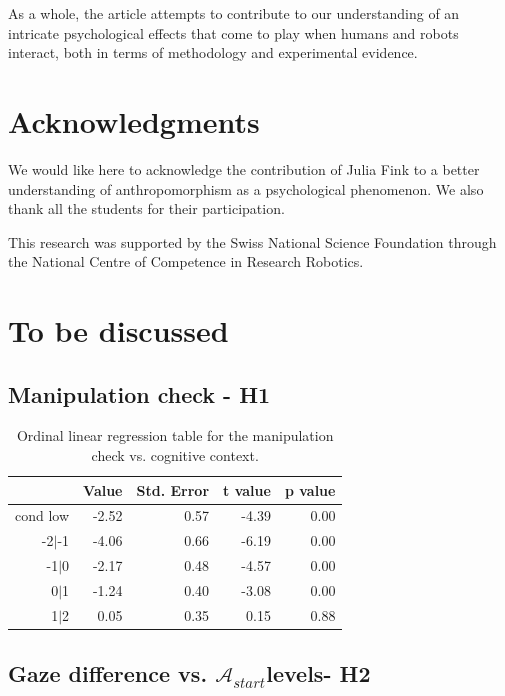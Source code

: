 \documentclass[lettersize, noapacite, twoside, HRI]{apa_HRI}
\newcommand{\anti}{{$\mathcal{A}_{start}$\xspace}}
\begin{document}
As a whole, the article attempts to contribute to our understanding of an
intricate psychological effects that come to play when humans and robots
interact, both in terms of methodology and experimental evidence.


\section*{Acknowledgments}

We would like here to acknowledge the contribution of Julia Fink to a better
understanding of anthropomorphism as a psychological phenomenon. We also thank
all the students for their participation.

This research was supported by the Swiss National Science Foundation through the
National Centre of Competence in Research Robotics.

\newpage


\section {To be discussed}


\subsection{Manipulation check - H1}


\begin{table}[ht]
\caption{Ordinal linear regression table for the manipulation check vs. cognitive context.}
\centering
\begin{tabular}{rrrrr}
  \hline
 & Value & Std. Error & t value & p value \\ 
  \hline
cond low & -2.52 & 0.57 & -4.39 & 0.00 \\ 
  -2$|$-1 & -4.06 & 0.66 & -6.19 & 0.00 \\ 
  -1$|$0 & -2.17 & 0.48 & -4.57 & 0.00 \\ 
  0$|$1 & -1.24 & 0.40 & -3.08 & 0.00 \\ 
  1$|$2 & 0.05 & 0.35 & 0.15 & 0.88 \\ 
   \hline
\end{tabular}
\end{table}



\subsection{Gaze difference vs. \anti levels- H2}
\end{document}
